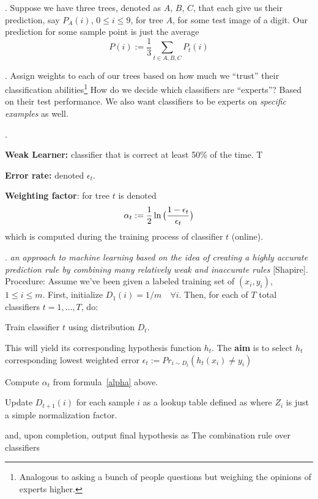 \documentclass[12pt]{article}
\newcommand{\myspace}{\vspace{2\bigskipamount}}
\newcommand\p{\Needspace{10\baselineskip} \noindent}
\begin{document}
\myspace
\p {}. Suppose we have three trees, denoted as $A$, $B$, $C$, that each give us their prediction, say $P_A(i)$, $0 \le i \le 9$, for tree $A$, for some test image of a digit. Our prediction for some sample point is just the average
$$
P(i) := \frac{1}{3} \sum_{t \in A,B,C} P_t(i)
$$

\myspace
\p {}. Assign weights to each of our trees based on how much we ``trust'' their classification abilities\footnote{Analogous to asking a bunch of people questions but weighing the opinions of experts higher.} How do we decide which classifiers are ``experts''? Based on their test performance. We also want classifiers to be experts on \textit{specific examples} as well.

\myspace
\p  {}. 
\begin{compactitem}[$\rightarrow$]
	\item \textbf{Weak Learner:} classifier that is correct at least 50\% of the time. T
	\item \textbf{Error rate:} denoted $\epsilon_t$. 
	\item \textbf{Weighting factor}: for tree $t$ is denoted 
	$$
	\alpha_t := \frac{1}{2} \ln\big( \frac{1 - \epsilon_t}{\epsilon_t} \big) \label{alpha}
	$$
	which is computed during the training process of classifier $t$ (online). 
\end{compactitem}

\myspace
\p {}. \textit{an approach to machine learning based on the idea of creating a highly accurate prediction rule by combining many relatively weak and inaccurate rules} [Shapire]. Procedure: Assume we've been given a labeled training set of $(x_i, y_i)$, $1 \le i \le m$. First, initialize $D_1(i) = 1/m \quad \forall i$. Then, for each of $T$ total classifiers $t = 1, \ldots, T$, do:
\begin{compactitem}
	\item Train classifier $t$ using distribution $D_t$. 
	
	\item This will yield its corresponding hypothesis function $h_t$. The \textbf{aim} is to select $h_t$ corresponding lowest weighted error $\epsilon_t := Pr_{i\sim D_t} (h_t(x_i) \ne y_i)$
	
	\item Compute $\alpha_t$ from formula~\ref{alpha} above.
	
	\item Update $D_{t + 1}(i)$ for each sample $i$ as a lookup table defined as 
		where $Z_i$ is just a simple normalization factor.
\end{compactitem}
and, upon completion, output final hypothesis as The combination rule over classifiers
\end{document}
